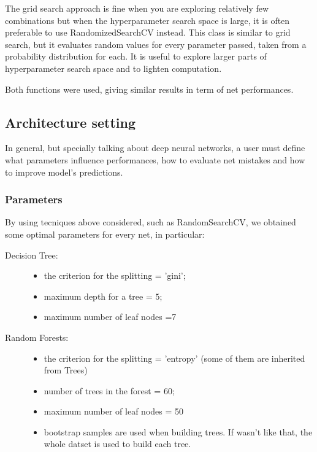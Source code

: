 \documentclass{article}
\begin{document}
The grid search approach is fine when you are exploring relatively few combinations but when the hyperparameter search space is large, it is often preferable to use RandomizedSearchCV instead. This class is similar to grid search, but it evaluates random values for every parameter passed, taken from a probability distribution for each.
It is useful to explore larger parts of hyperparameter search space and to lighten computation.

Both functions were used, giving similar results in term of net performances.


\subsection{Architecture setting}
In general, but specially talking about deep neural networks, a user must define what parameters influence performances, how to evaluate net mistakes and how to improve model's predictions.


\subsubsection{Parameters}

By using tecniques above considered, such as RandomSearchCV, we obtained some optimal parameters for every net, in particular:

\begin{description}[align=left]
\item [SVM:]
\end{description}

\begin{description}
\item [Decision Tree:] \begin{itemize}

\item the criterion for the splitting = 'gini';
\item maximum depth for a tree = $5$;
\item maximum number of leaf nodes =7
\end{itemize}
\end{description}

\begin{description}
\item[Random Forests:]\begin{itemize}

\item the criterion for the splitting = 'entropy' (some of them are inherited from Trees)
\item number of trees in the forest = 60;
\item maximum number of leaf nodes = 50
\item bootstrap samples are used when building trees. If wasn't like that, the whole datset is used to build each tree.\end{itemize}
\end{description}
                            
\end{document}
